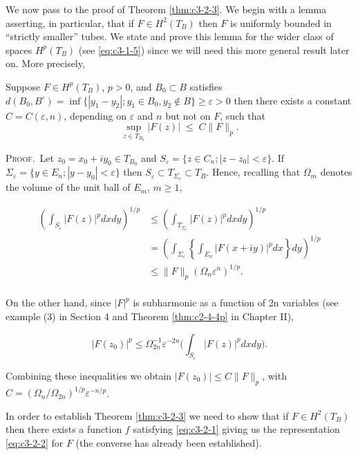 We now pass to the proof of Theorem \ref{thm:c3-2-3}. We begin with a lemma asserting, in particular, that if $F \in H^2(T_B)$ then $F$ is uniformly bounded in ``strictly smaller'' tubes. We state and prove this lemma for the wider class of spaces $H^p(T_B)$ (see \eqref{eq:c3-1-5}) since we will need this more general result later on. More precisely,

\begin{lemma}
\label{lem:c3-2-12}
Suppose $F \in H^p(T_B)$, $p > 0$, and $B_0 \subset B$ satisfies $d(B_0, B^{\circ}) = \inf\{|y_1 - y_2|; y_1 \in B_0, y_2 \notin B\} \geq \varepsilon > 0$ then there exists a constant $C = C(\varepsilon, n)$, depending on $\varepsilon$ and $n$ but not on $F$, such that
\[
\sup_{z\in T_{B_{0}}}|F(z)|\;\leq\;C\|F\|_{p}.
\]

\end{lemma}

\textsc{Proof.}\ Let $z_0 = x_0 + iy_0 \in T_{B_0}$ and $S_\varepsilon = \{z \in C_n; |z - z_0| < \varepsilon\}$. If $\Sigma_\varepsilon = \{y \in E_n; |y - y_0| < \varepsilon\}$ then $S_\varepsilon \subset T_{\Sigma_\varepsilon} \subset T_B$. Hence, recalling that $\Omega_m$ denotes the volume of the unit ball of $E_m$, $m \geq 1$,

\[
\begin{aligned}{\left(\int_{S_{\varepsilon}}|F(z)|^{p}d x d y\right)^{1/p}}&{{}\leq\left(\int_{T_{\Sigma_{\varepsilon}}}|F(z)|^{p}d x d y\right)^{1/p}}\\ {}&{{}=\left(\int_{\Sigma_{\varepsilon}}\left\{\int_{E_{n}}|F(x+i y)|^{p}d x\right\}d y\right)^{1/p}}\\ {}&{{}\leq\|F\|_{p}(\Omega_{n}\varepsilon^{n})^{1/p}.}\\ \end{aligned}
\]

On the other hand, since $|F|^p$ is subharmonic as a function of 2n variables (see example (3) in Section 4 and Theorem \ref{thm:c2-4-4p} in Chapter II),

\[
|F(z_{0})|^{p}\leq\Omega_{2n}^{-1}\varepsilon^{-2n}\Biggl(\int_{S_{\varepsilon}}|F(z)|^{p}d x d y\Biggr).
\]

Combining these inequalities we obtain $|F(z_0)| \leq C\|F\|_p$, with $C = (\Omega_n/\Omega_{2n})^{1/p} \varepsilon^{-n/p}$.

In order to establish Theorem \ref{thm:c3-2-3} we need to show that if $F \in H^2(T_B)$ then there exists a function $f$ satisfying \eqref{eq:c3-2-1} giving us the representation \eqref{eq:c3-2-2} for $F$ (the converse has already been established).


